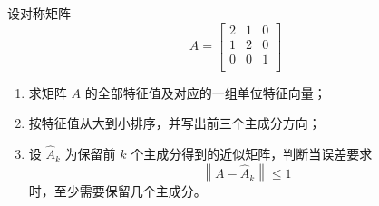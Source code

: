 设对称矩阵 \[
A = \begin{bmatrix}
    2 & 1 & 0 \\
    1 & 2 & 0 \\
    0 & 0 & 1 \\
\end{bmatrix}
\]
\begin{enumerate}
    \item 求矩阵 $A$ 的全部特征值及对应的一组单位特征向量；
    \item 按特征值从大到小排序，并写出前三个主成分方向；
    \item 设 $\hat{A}_k$ 为保留前 $k$ 个主成分得到的近似矩阵，判断当误差要求 \[\left\|A - \hat{A}_k\right\| \le 1\] 时，至少需要保留几个主成分。
\end{enumerate}
